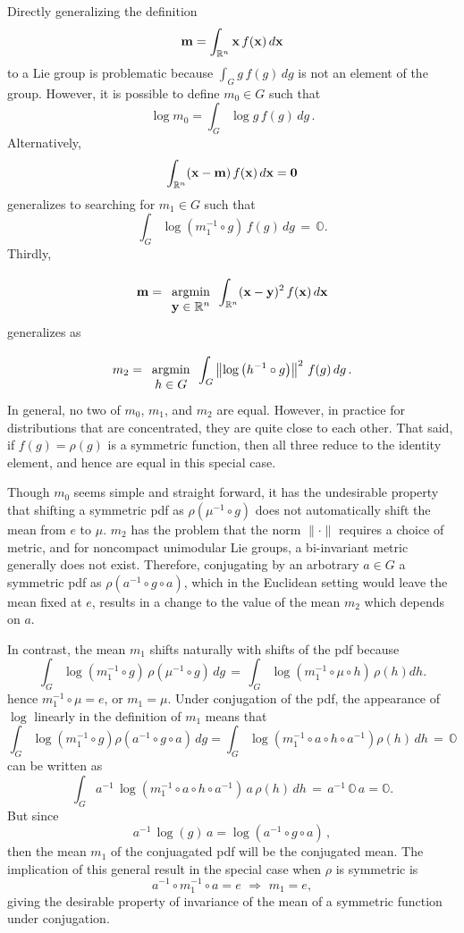 \documentclass{svmult}
\newcommand{\OO}{\mathbb{O}}
\newcommand{\IR}{\mathbb{R}}
\newcommand{\xx}{{\bf x}}
\newcommand{\yy}{{\bf y}}
\begin{document}
Directly generalizing the definition
$$ {\bf m} = \int_{\IR^n} \xx \, f(\xx) \, d\xx $$
to a Lie group is problematic because $\int_G g\, f(g)\, dg$ is not an element
of the group. However, it is possible to define $m_0 \in G$ such that
$$ \log m_0 = \int_G \log g \, f(g) \, dg\,. $$
Alternatively,
$$ \int_{\IR^n} (\xx - {\bf m})\, f(\xx) \, d\xx = {\bf 0} $$
generalizes to searching for $m_1 \in G$ such that
$$ \int_G \log \left(m_{1}^{-1} \circ g\right) \, f(g) \, dg \,=\,\OO. $$
Thirdly,
$$ {\bf m} =
\begin{array}{c}
{} \\
{\rm  argmin} \\
{\yy \in \IR^n} \end{array}
\int_{\IR^n} (\xx - \yy)^2 \, f(\xx) \, d\xx $$
generalizes as
$$ m_2 =
\begin{array}{c}
{} \\
{\rm  argmin} \\
{h \in G} \end{array}
\int_G \left\|\log \left(h^{-1} \circ g\right)\right\|^2 \, f(g) \, dg\,. $$
In general, no two of $m_0$, $m_1$, and $m_2$ are equal. However, in practice
for distributions that are concentrated, they are quite close to each other.
That said, if $f(g) = \rho(g)$ is a symmetric function, then all three reduce to the identity element, and hence are equal in this special case.

Though $m_0$ seems simple and straight forward, it has the undesirable property that shifting a symmetric pdf as $\rho(\mu^{-1} \circ g)$ does
not automatically shift the mean from $e$ to $\mu$. $m_2$ has the problem
that the norm $\|\cdot\|$ requires a choice of metric, and for noncompact
unimodular Lie groups, a bi-invariant metric generally does not exist.
Therefore, conjugating by an arbotrary $a \in G$ a symmetric pdf as $\rho(a^{-1} \circ g \circ a)$, which in the Euclidean setting would leave the mean fixed at $e$, results in a change to the value of the mean $m_2$ which
depends on $a$.

In contrast, the mean $m_1$ shifts naturally with shifts of the pdf because
$$ \int_G \log \left(m_{1}^{-1} \circ g\right) \, \rho(\mu^{-1} \circ g) \, dg \,=\, \int_G \log \left(m_{1}^{-1} \circ \mu \circ h\right) \, \rho(h) dh. $$
hence $m_{1}^{-1} \circ \mu = e$, or $m_1 = \mu$. Under conjugation of the pdf, the appearance of $\log$ linearly in the definition of $m_1$ means that
$$ \int_G \log \left(m_{1}^{-1} \circ g\right) \rho(a^{-1} \circ g \circ a) \, dg = \int_G \log \left(m_{1}^{-1} \circ a \circ h \circ a^{-1} \right) \rho(h) \, dh \,=\,\OO $$
can be written as
$$ \int_G a^{-1}\,\log \left(m_{1}^{-1} \circ a \circ h \circ a^{-1} \right)\,a \, \rho(h) \, dh \,=\,a^{-1}\,\OO\,a = \OO. $$
But since
$$ a^{-1}\,\log (g) \, a = \log(a^{-1} \circ g \circ a)\,, $$
then the mean $m_1$ of the conjuagated pdf will be the conjugated mean. The implication of this general result in the special case when $\rho$ is symmetric is
$$ a^{-1} \circ m_{1}^{-1} \circ a = e \,\,\Longrightarrow\,\, m_{1} = e, $$
giving the desirable property of invariance of the mean of a symmetric function under conjugation.
\end{document}
